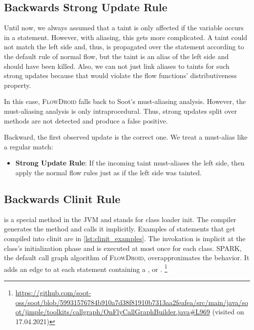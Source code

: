\documentclass[../draft.tex]{subfiles}
\begin{document}
    \subsection{Backwards Strong Update Rule}
    Until now, we always assumed that a taint is only affected if the variable occurs in a statement.
    However, with aliasing, this gets more complicated.
    A taint could not match the left side and, thus, is propagated over the statement according to the default rule of normal flow, but the taint is an alias of the left side and should have been killed.
    Also, we can not just link aliases to taints for such strong updates because that would violate the flow functions' distributiveness property.

    In this case, \textsc{FlowDroid} falls back to Soot's must-aliasing analysis. However, the must-aliasing analysis is only intraprocedural. Thus, strong updates split over methods are not detected and produce a false positive.

    Backward, the first observed update is the correct one. We treat a must-alias like a regular match:
    \begin{itemize}
        \item \textbf{Strong Update Rule}: If the incoming taint must-aliases the left side, then apply the normal flow rules just as if the left side was tainted.
    \end{itemize}

    \subsection{Backwards Clinit Rule}\label{s:clinitrule}
     is a special method in the JVM and stands for class loader init.
    The compiler generates the method and calls it implicitly. Examples of statements that get compiled into clinit are in \autoref{lst:clinit_examples}.
    The invokation is implicit at the class's initialization phase and is executed at most once for each class\footnotemark{}.
    SPARK, the default call graph algorithm of \textsc{FlowDroid}, overapproximates the  behavior.
    It adds an edge to  at each statement containing a ,  or \footnotemark{}.
    \footnote{\url{https://github.com/soot-oss/soot/blob/59931576784b910a7d38f81910b7313aa2feafea/src/main/java/soot/jimple/toolkits/callgraph/OnFlyCallGraphBuilder.java\#L969} (visited on 17.04.2021)}
\end{document}
